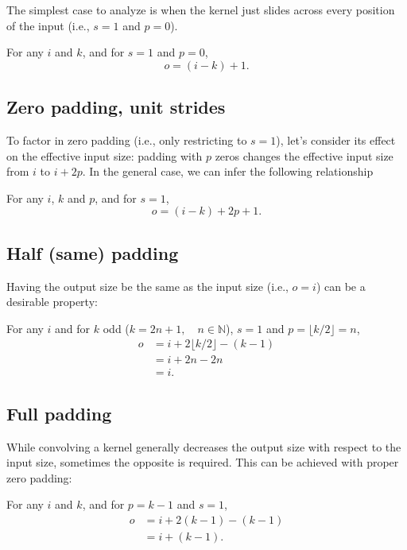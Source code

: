\documentclass[%
oneside,                 %
final,                   %
10pt]{article}
\begin{document}
The simplest case to analyze is when the kernel just slides across every
position of the input (i.e., $s = 1$ and $p = 0$).

For any $i$ and $k$, and for $s = 1$ and $p = 0$,
\begin{equation*}
    o = (i - k) + 1.
\end{equation*}

\subsection*{Zero padding, unit strides}

To factor in zero padding (i.e., only restricting to $s = 1$), let's consider
its effect on the effective input size: padding with $p$ zeros changes the
effective input size from $i$ to $i + 2p$. In the general case, we can infer the following
relationship

For any $i$, $k$ and $p$, and for $s = 1$,
\begin{equation*}
    o = (i - k) + 2p + 1.
\end{equation*}

\subsection*{Half (same) padding}

Having the output size be the same as the input size (i.e., $o = i$) can be a
desirable property:

For any $i$ and for $k$ odd ($k = 2n + 1, \quad n \in \mathbb{N}$), $s = 1$ and
$p = \lfloor k / 2 \rfloor = n$,
\begin{equation*}
\begin{split}
    o &= i + 2 \lfloor k / 2 \rfloor - (k - 1) \\
      &= i + 2n - 2n \\
      &= i.
\end{split}
\end{equation*}

\subsection*{Full padding}

While convolving a kernel generally decreases the output size with
respect to the input size, sometimes the opposite is required. This can be
achieved with proper zero padding:

For any $i$ and $k$, and for $p = k - 1$ and $s = 1$,
\begin{equation*}
\begin{split}
    o &= i + 2(k - 1) - (k - 1) \\
      &= i + (k - 1).
\end{split}
\end{equation*}
\end{document}
